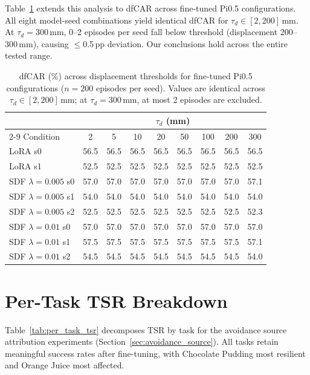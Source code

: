 Table~\ref{tab:dfcar_threshold} extends this analysis to dfCAR across fine-tuned Pi0.5 configurations. All eight model-seed combinations yield identical dfCAR for $\tau_d \in [2, 200]$\,mm. At $\tau_d = 300$\,mm, 0--2 episodes per seed fall below threshold (displacement 200--300\,mm), causing $\leq$0.5\,pp deviation. Our conclusions hold across the entire tested range.

\begin{table}[h]
\centering
\caption{dfCAR (\%) across displacement thresholds for fine-tuned Pi0.5 configurations ($n = 200$ episodes per seed). Values are identical across $\tau_d \in [2, 200]$\,mm; at $\tau_d = 300$\,mm, at most 2 episodes are excluded.}
\label{tab:dfcar_threshold}
\vspace{2pt}
\footnotesize
\begin{tabular}{lcccccccc}
\toprule
& \multicolumn{8}{c}{$\tau_d$ (mm)} \\
\cmidrule(lr){2-9}
Condition & 2 & 5 & 10 & 20 & 50 & 100 & 200 & 300 \\
\midrule
LoRA s0            & 56.5 & 56.5 & 56.5 & 56.5 & 56.5 & 56.5 & 56.5 & 56.5 \\
LoRA s1            & 52.5 & 52.5 & 52.5 & 52.5 & 52.5 & 52.5 & 52.5 & 52.5 \\
SDF $\lambda{=}0.005$ s0 & 57.0 & 57.0 & 57.0 & 57.0 & 57.0 & 57.0 & 57.0 & 57.1 \\
SDF $\lambda{=}0.005$ s1 & 54.0 & 54.0 & 54.0 & 54.0 & 54.0 & 54.0 & 54.0 & 54.0 \\
SDF $\lambda{=}0.005$ s2 & 52.5 & 52.5 & 52.5 & 52.5 & 52.5 & 52.5 & 52.5 & 52.3 \\
SDF $\lambda{=}0.01$ s0  & 57.0 & 57.0 & 57.0 & 57.0 & 57.0 & 57.0 & 57.0 & 57.0 \\
SDF $\lambda{=}0.01$ s1  & 57.5 & 57.5 & 57.5 & 57.5 & 57.5 & 57.5 & 57.5 & 57.1 \\
SDF $\lambda{=}0.01$ s2  & 54.5 & 54.5 & 54.5 & 54.5 & 54.5 & 54.5 & 54.5 & 54.0 \\
\bottomrule
\end{tabular}
\end{table}


\section{Per-Task TSR Breakdown}\label{sec:appendix_tsr_pertask}

Table~\ref{tab:per_task_tsr} decomposes TSR by task for the avoidance source attribution experiments (Section~\ref{sec:avoidance_source}). All tasks retain meaningful success rates after fine-tuning, with Chocolate Pudding most resilient and Orange Juice most affected.

